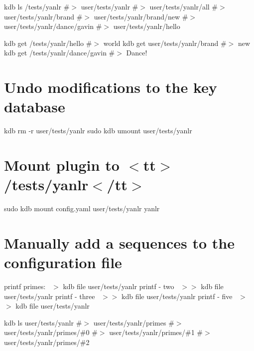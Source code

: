 kdb ls /tests/yanlr \#$>$ user/tests/yanlr \#$>$ user/tests/yanlr/all \#$>$ user/tests/yanlr/brand \#$>$ user/tests/yanlr/brand/new \#$>$ user/tests/yanlr/dance/gavin \#$>$ user/tests/yanlr/hello

kdb get /tests/yanlr/hello \#$>$ world kdb get user/tests/yanlr/brand \#$>$ new kdb get /tests/yanlr/dance/gavin \#$>$ Dance!\hypertarget{autotoc_md861_autotoc_md874}{}\section{Undo modifications to the key database}\label{autotoc_md861_autotoc_md874}
kdb rm -\/r user/tests/yanlr sudo kdb umount user/tests/yanlr 
\begin{DoxyCode}{0}
\end{DoxyCode}
 \hypertarget{autotoc_md861_autotoc_md875}{}\section{Mount plugin to $<$tt$>$/tests/yanlr$<$/tt$>$}\label{autotoc_md861_autotoc_md875}
sudo kdb mount config.\+yaml user/tests/yanlr yanlr\hypertarget{autotoc_md861_autotoc_md876}{}\section{Manually add a sequences to the configuration file}\label{autotoc_md861_autotoc_md876}
printf \textquotesingle{}primes\+:~\newline
\textquotesingle{} $>$ {\ttfamily kdb file user/tests/yanlr} printf \textquotesingle{} -\/ two~\newline
\textquotesingle{} $>$$>$ {\ttfamily kdb file user/tests/yanlr} printf \textquotesingle{} -\/ three~\newline
\textquotesingle{} $>$$>$ {\ttfamily kdb file user/tests/yanlr} printf \textquotesingle{} -\/ five~\newline
\textquotesingle{} $>$$>$ {\ttfamily kdb file user/tests/yanlr}

kdb ls user/tests/yanlr \#$>$ user/tests/yanlr/primes \#$>$ user/tests/yanlr/primes/\#0 \#$>$ user/tests/yanlr/primes/\#1 \#$>$ user/tests/yanlr/primes/\#2

